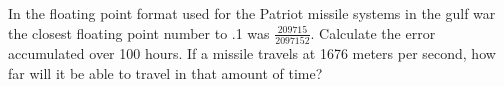 \begin{problem}
In the floating point format used for the Patriot missile systems in the gulf war the closest floating point number to .1 was $\frac{209715}{2097152}$.
Calculate the error accumulated over 100 hours.
If a missile travels at 1676 meters per second, how far will it be able to travel in that amount of time?
\end{problem}